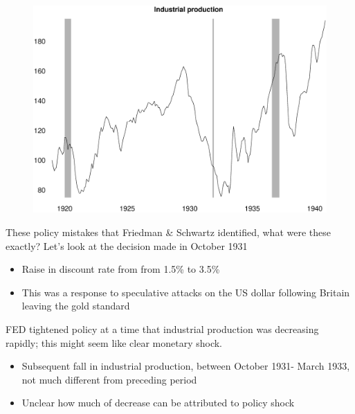\documentclass{beamer}
\begin{document}
\begin{frame}
  \begin{figure}
    \includegraphics[scale=.3]{industrial_production.eps}
  \end{figure}
\end{frame}

\begin{frame}
 These policy mistakes that Friedman \& Schwartz identified, what were these exactly?
 Let's look at the decision made in October 1931
 \medskip
  \begin{itemize}
    \item Raise in discount rate from from 1.5\% to 3.5\%
    \item This was a response to speculative attacks on the US dollar following Britain leaving the gold standard
  \end{itemize}  
\end{frame}

\begin{frame}
FED tightened policy at a time that industrial production was decreasing rapidly; this might seem like clear monetary shock.
  \begin{itemize}
    \item Subsequent fall in industrial production, between October 1931- March 1933, not much different from preceding period
    \item Unclear how much of decrease can be attributed to policy shock
  \end{itemize}  
\end{frame}
\end{document}
